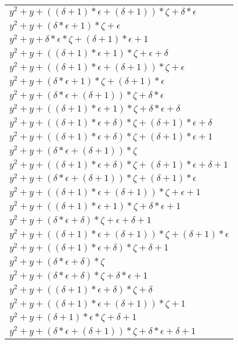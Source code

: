 \documentclass[12pt]{article}
\begin{document}
\begin{center}
\begin{longtable}{|l|}
	$y^2 + y + ((\delta + 1)*\epsilon + (\delta + 1))*\zeta + \delta*\epsilon$ \\
	$y^2 + y + (\delta*\epsilon + 1)*\zeta + \epsilon$ \\
	$y^2 + y + \delta*\epsilon*\zeta + (\delta + 1)*\epsilon + 1$ \\
	$y^2 + y + ((\delta + 1)*\epsilon + 1)*\zeta + \epsilon + \delta$ \\
	$y^2 + y + ((\delta + 1)*\epsilon + (\delta + 1))*\zeta + \epsilon$ \\
	$y^2 + y + (\delta*\epsilon + 1)*\zeta + (\delta + 1)*\epsilon$ \\
	$y^2 + y + (\delta*\epsilon + (\delta + 1))*\zeta + \delta*\epsilon$ \\
	$y^2 + y + ((\delta + 1)*\epsilon + 1)*\zeta + \delta*\epsilon + \delta$ \\
	$y^2 + y + ((\delta + 1)*\epsilon + \delta)*\zeta + (\delta + 1)*\epsilon + \delta$ \\
	$y^2 + y + ((\delta + 1)*\epsilon + \delta)*\zeta + (\delta + 1)*\epsilon + 1$ \\
	$y^2 + y + (\delta*\epsilon + (\delta + 1))*\zeta$ \\
	$y^2 + y + ((\delta + 1)*\epsilon + \delta)*\zeta + (\delta + 1)*\epsilon + \delta + 1$ \\
	$y^2 + y + (\delta*\epsilon + (\delta + 1))*\zeta + (\delta + 1)*\epsilon$ \\
	$y^2 + y + ((\delta + 1)*\epsilon + (\delta + 1))*\zeta + \epsilon + 1$ \\
	$y^2 + y + ((\delta + 1)*\epsilon + 1)*\zeta + \delta*\epsilon + 1$ \\
	$y^2 + y + (\delta*\epsilon + \delta)*\zeta + \epsilon + \delta + 1$ \\
	$y^2 + y + ((\delta + 1)*\epsilon + (\delta + 1))*\zeta + (\delta + 1)*\epsilon$ \\
	$y^2 + y + ((\delta + 1)*\epsilon + \delta)*\zeta + \delta + 1$ \\
	$y^2 + y + (\delta*\epsilon + \delta)*\zeta$ \\
	$y^2 + y + (\delta*\epsilon + \delta)*\zeta + \delta*\epsilon + 1$ \\
	$y^2 + y + ((\delta + 1)*\epsilon + \delta)*\zeta + \delta$ \\
	$y^2 + y + ((\delta + 1)*\epsilon + (\delta + 1))*\zeta + 1$ \\
	$y^2 + y + (\delta + 1)*\epsilon*\zeta + \delta + 1$ \\
	$y^2 + y + (\delta*\epsilon + (\delta + 1))*\zeta + \delta*\epsilon + \delta + 1$ \\

\end{longtable}
\end{center}
\end{document}
